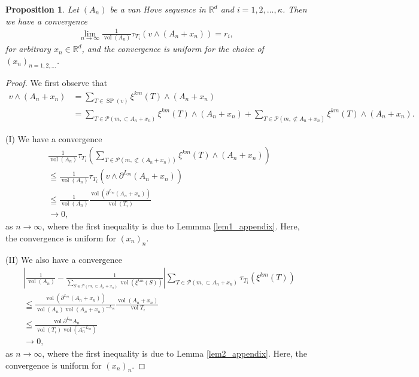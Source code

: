 \documentclass[a4]{amsart}
\DeclareMathOperator{\vol}{vol}
\DeclareMathOperator{\SP}{SP}
\newcommand{\sci}{\wedge}
\newtheorem{prop}[theorem]{Proposition}
\theoremstyle{definition}
\begin{document}
\begin{prop}
 Let $(A_n)$ be a van Hove sequence in $\mathbb{R}^d$ and $i=1,2,\ldots ,\kappa$.
Then we have a convergence
\begin{align*}
 \lim_{n\rightarrow\infty}\frac{1}{\vol(A_n)}\tau_{T_i}(v\sci(A_n+x_n))=r_i,
\end{align*}
for arbitrary $x_n\in\mathbb{R}^d$, and the convergence is uniform for the choice of
$(x_n)_{n=1,2,\ldots}$.
\end{prop}

\begin{proof}
 We first observe that
\begin{align*}
 v\sci (A_n+x_n)&=\sum_{T\in\SP(v)}\xi^{km}(T)\sci(A_n+x_n)\\
&=\sum_{T\in\mathcal{P}(m,\subset A_n+x_n)}\xi^{km}(T)\sci(A_n+x_n)
+\sum_{T\in\mathcal{P}(m,\not\subset A_n+x_n)}\xi^{km}(T)\sci(A_n+x_n).
\end{align*}

(I) We have a convergence
\begin{align*}
& \frac{1}{\vol(A_n)}\tau_{T_i}\left(\sum_{T\in\mathcal{P}(m,\not\subset(A_n+x_n))}\xi^{km}(T)\sci (A_n+x_n)\right)\\
&\leqq\frac{1}{\vol(A_n)}\tau_{T_i}(v\sci\partial^{L_m}(A_n+x_n))\\
&\leqq \frac{1}{\vol(A_n)}\frac{\vol(\partial^{L_m}(A_n+x_n))}{\vol(T_i)}\\
&\rightarrow 0,
\end{align*}
as $n\rightarrow\infty$,
where the first inequality is due to Lemmma \ref{lem1_appendix}. Here, the convergence is uniform
for $(x_n)_n$.

(II) We also have a convergence
\begin{align*}
& \left|\frac{1}{\vol(A_n)}-\frac{1}{\sum_{S\in\mathcal{P}(m,\subset A_n+x_n)}\vol(\xi^{km}(S))}\right|\sum_{T\in\mathcal{P}(m,\subset A_n+x_n)}\tau_{T_i}(\xi^{km}(T))\\
&\leqq \frac{\vol(\partial^{L_m}(A_n+x_n))}{\vol(A_n)\vol(A_n+x_n)^{-L_m}}\frac{\vol(A_n+x_n)}{\vol T_i}\\
&\leqq\frac{\vol\partial^{L_m}A_n}{\vol(T_i)\vol(A_n^{-L_m})}\\
&\rightarrow 0,
\end{align*}
as $n\rightarrow \infty$, where the first inequality is due to Lemma \ref{lem2_appendix}.
Here, the convergence is uniform for $(x_n)_n$.


\end{proof}
\end{document}
